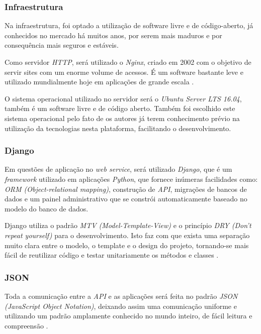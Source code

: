 \documentclass[
	12pt,
	oneside,
	a4paper,
	english,
	brazil,
]{abntex2}
\begin{document}
\subsubsection{Infraestrutura}

Na infraestrutura, foi optado a utilização de software livre e de código-aberto, já conhecidos no mercado há muitos anos, por serem mais maduros e por consequência mais seguros e estáveis.

Como servidor \emph{HTTP}, será utilizado o \emph{Nginx}, criado em 2002 com o objetivo de servir sites com um enorme volume de acessos. É um software bastante leve e utilizado mundialmente hoje em aplicações de grande escala \cite{nginx-book}.

O sistema operacional utilizado no servidor será o \emph{Ubuntu Server LTS 16.04}, também é um software livre e de código aberto. Também foi escolhido este sistema operacional pelo fato de os autores já terem conhecimento prévio na utilização da tecnologias nesta plataforma, facilitando o desenvolvimento.

\subsubsection{Django}

Em questões de aplicação no \emph{web service}, será utilizado \emph{Django}, que é um \emph{framework} utilizado em aplicações \emph{Python}, que fornece inúmeras facilidades como: \emph{ORM (Object-relational mapping)}, construção de \emph{API}, migrações de bancos de dados e um painel administrativo que se constrói automaticamente baseado no modelo do banco de dados.

Django utiliza o padrão \emph{MTV (Model-Template-View)} e o princípio \emph{DRY (Don't repeat yourself)} para o desenvolvimento. Isto faz com que exista uma separação muito clara entre o modelo, o template e o design do projeto, tornando-se mais fácil de reutilizar código e testar unitariamente os métodos e classes \cite{django-wikipedia}. 

\subsubsection{JSON}

Toda a comunicação entre a \emph{API} e as aplicações será feita no padrão \emph{JSON (JavaScript Object Notation)}, deixando assim uma comunicação uniforme e utilizando um padrão amplamente conhecido no mundo inteiro, de fácil leitura e compreensão \cite{footnote-json}.
\end{document}
